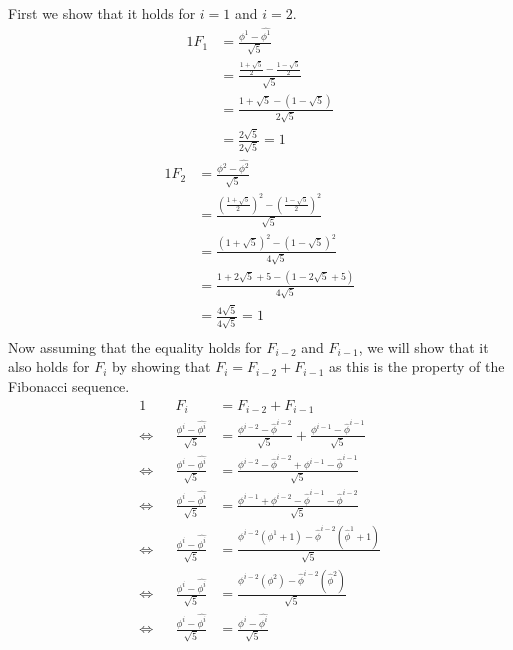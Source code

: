 \documentclass[11pt]{article}
\numberwithin{equation}{section}
\renewcommand{\iff}{\Leftrightarrow}
\begin{document}
First we show that it holds for $i=1$ and $i=2$.
\begin{alignat*}{1}
    F_1 &= \frac{\phi^1 - \widehat{\phi^1}}{\sqrt{5}}\\
        &= \frac{\frac{1+\sqrt{5}}{2} - \frac{1-\sqrt{5}}{2}}{\sqrt{5}}\\
        &= \frac{1+\sqrt{5} - (1-\sqrt{5})} {2\sqrt{5}}\\
        &= \frac{2\sqrt{5}} {2\sqrt{5}} = 1
\end{alignat*}
\begin{alignat*}{1}
    F_2 &= \frac{\phi^2 - \widehat{\phi^2}} {\sqrt{5}}\\
        &= \frac{(\frac{1+\sqrt{5}}{2})^2 - (\frac{1-\sqrt{5}}{2})^2} {\sqrt{5}}\\
        &= \frac{(1+\sqrt{5})^2 - (1-\sqrt{5})^2} {4\sqrt{5}}\\
        &= \frac{1+2\sqrt{5}+5 - (1-2\sqrt{5}+5)} {4\sqrt{5}}\\
        &= \frac{4\sqrt{5}} {4\sqrt{5}} = 1\\
\end{alignat*}
Now assuming that the equality holds for $F_{i-2}$ and $F_{i-1}$, we 
will show that it also holds for $F_i$ by showing that $F_i = F_{i-2} + F_{i-1}$
as this is the property of the Fibonacci sequence.
\begin{alignat*}{1}
    && F_i &= F_{i-2} + F_{i-1}\\
    \iff&& \frac{\phi^i - \widehat{\phi^i}}{\sqrt{5}}
            &= \frac{\phi^{i-2} - \widehat{\phi}^{i-2}}{\sqrt{5}}
            +  \frac{\phi^{i-1} - \widehat{\phi}^{i-1}}{\sqrt{5}}\\
    \iff&& \frac{\phi^i - \widehat{\phi^i}}{\sqrt{5}}
            &= \frac{\phi^{i-2} - \widehat{\phi}^{i-2}
            + \phi^{i-1} - \widehat{\phi}^{i-1}} {\sqrt{5}}\\
    \iff&& \frac{\phi^i - \widehat{\phi^i}}{\sqrt{5}}
            &= \frac{\phi^{i-1} + \phi^{i-2} - \widehat{\phi}^{i-1}
             - \widehat{\phi}^{i-2}} {\sqrt{5}}\\
    \iff&& \frac{\phi^i - \widehat{\phi^i}}{\sqrt{5}}
            &= \frac{\phi^{i-2} (\phi^{1} + 1) 
            - \widehat{\phi}^{i-2}(\widehat{\phi}^{1}+1)} {\sqrt{5}}\\
    \iff&& \frac{\phi^i - \widehat{\phi^i}}{\sqrt{5}}
            &= \frac{\phi^{i-2} (\phi^2) 
            - \widehat{\phi}^{i-2}(\widehat{\phi}^2)} {\sqrt{5}}\\
    \iff&& \frac{\phi^i - \widehat{\phi^i}}{\sqrt{5}}
            &= \frac{\phi^i - \widehat{\phi^i}}{\sqrt{5}}\\
\end{alignat*}
\end{document}
